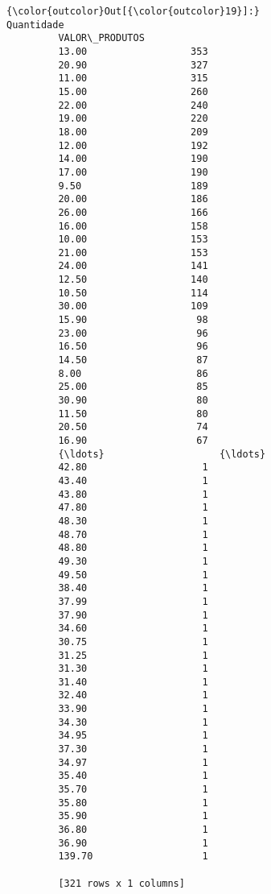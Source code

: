 \documentclass[11pt]{article}
\begin{document}
\begin{Verbatim}[commandchars=\\\{\}]
{\color{outcolor}Out[{\color{outcolor}19}]:}                 Quantidade
         VALOR\_PRODUTOS            
         13.00                  353
         20.90                  327
         11.00                  315
         15.00                  260
         22.00                  240
         19.00                  220
         18.00                  209
         12.00                  192
         14.00                  190
         17.00                  190
         9.50                   189
         20.00                  186
         26.00                  166
         16.00                  158
         10.00                  153
         21.00                  153
         24.00                  141
         12.50                  140
         10.50                  114
         30.00                  109
         15.90                   98
         23.00                   96
         16.50                   96
         14.50                   87
         8.00                    86
         25.00                   85
         30.90                   80
         11.50                   80
         20.50                   74
         16.90                   67
         {\ldots}                    {\ldots}
         42.80                    1
         43.40                    1
         43.80                    1
         47.80                    1
         48.30                    1
         48.70                    1
         48.80                    1
         49.30                    1
         49.50                    1
         38.40                    1
         37.99                    1
         37.90                    1
         34.60                    1
         30.75                    1
         31.25                    1
         31.30                    1
         31.40                    1
         32.40                    1
         33.90                    1
         34.30                    1
         34.95                    1
         37.30                    1
         34.97                    1
         35.40                    1
         35.70                    1
         35.80                    1
         35.90                    1
         36.80                    1
         36.90                    1
         139.70                   1
         
         [321 rows x 1 columns]
\end{Verbatim}
            
\end{document}
